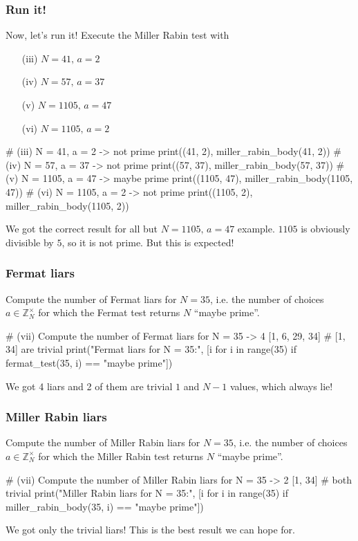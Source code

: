 \documentclass{article}
\newcommand{\Z}{\mathbb{Z}}
\begin{document}
  \subsubsection{Run it!}
  \begin{centerframebox}
    Now, let's run it! Execute the Miller Rabin test with
    \begin{enumerate}
      \item[(iii)] $N = 41,\, a = 2$
      \item[(iv)] $N = 57,\, a = 37$
      \item[(v)] $N = 1105,\, a = 47$
      \item[(vi)] $N = 1105,\, a = 2$
    \end{enumerate}
  \end{centerframebox}
  \begin{mylisting}
    # (iii) N = 41, a = 2    -> not prime
    print((41, 2), miller_rabin_body(41, 2))
    # (iv) N = 57, a = 37    -> not prime
    print((57, 37), miller_rabin_body(57, 37))
    # (v) N = 1105, a = 47   -> maybe prime
    print((1105, 47), miller_rabin_body(1105, 47))
    # (vi) N = 1105, a = 2   -> not prime
    print((1105, 2), miller_rabin_body(1105, 2))
  \end{mylisting}
  We got the correct result for all but $N = 1105,\, a = 47$ example.
  $1105$ is obviously divisible by $5$, so it is not prime.
  But this is expected!

  \subsubsection{Fermat liars}
  \begin{centerframebox}
    Compute the number of Fermat liars for $N = 35$, i.e. the number of
    choices $a \in \Z^\times_N$ for which the Fermat test returns $N$ ``maybe prime''.
  \end{centerframebox}
  \begin{mylisting}
    # (vii) Compute the number of Fermat liars for N = 35  -> 4  [1, 6, 29, 34]
    # [1, 34] are trivial
    print("Fermat liars for N = 35:", [i for i in range(35) if fermat_test(35, i) == "maybe prime"])
  \end{mylisting}
  We got 4 liars and 2 of them are trivial $1$ and $N-1$ values, which always lie!

  \subsubsection{Miller Rabin liars}
  \begin{centerframebox}
    Compute the number of Miller Rabin liars for $N = 35$, i.e. the number of
    choices $a \in \Z^\times_N$ for which the Miller Rabin test returns $N$ ``maybe prime''.
  \end{centerframebox}
  \begin{mylisting}
    # (vii) Compute the number of Miller Rabin liars for N = 35  -> 2  [1, 34]
    # both trivial
    print("Miller Rabin liars for N = 35:", [i for i in range(35) if miller_rabin_body(35, i) == "maybe prime"])
  \end{mylisting}
  We got only the trivial liars! This is the best result we can hope for.
\end{document}
